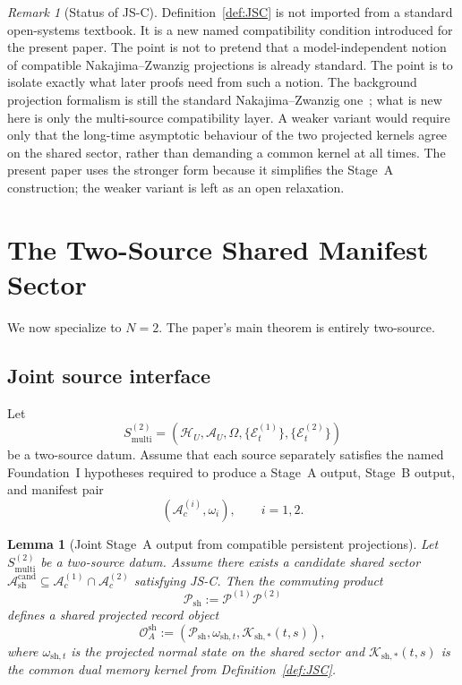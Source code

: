\documentclass[12pt]{article}
\newtheorem{lemma}[theorem]{Lemma}
\theoremstyle{definition}
\theoremstyle{remark}
\newtheorem{remark}[theorem]{Remark}
\begin{document}
\begin{remark}[Status of JS-C]
Definition~\ref{def:JSC} is not imported from a standard open-systems
textbook. It is a new named compatibility condition introduced for the
present paper. The point is not to pretend that a model-independent
notion of compatible Nakajima--Zwanzig projections is already standard.
The point is to isolate exactly what later proofs need from such a
notion. The background projection formalism is still the standard
Nakajima--Zwanzig one~\cite{Nakajima1958,Zwanzig1960}; what is new here
is only the multi-source compatibility layer. A weaker variant would
require only that the long-time asymptotic behaviour of the two
projected kernels agree on the shared sector, rather than demanding a
common kernel at all times. The present paper uses the stronger form
because it simplifies the Stage~A construction; the weaker variant is
left as an open relaxation.
\end{remark}

\section{The Two-Source Shared Manifest Sector}\label{sec:two}

We now specialize to \(N=2\). The paper's main theorem is entirely
two-source.

\subsection{Joint source interface}

Let
\[
S_{\mathrm{multi}}^{(2)}
=
(\mathcal H_U,\mathcal A_U,\Omega,\{\mathcal E_t^{(1)}\},\{\mathcal E_t^{(2)}\})
\]
be a two-source datum. Assume that each source separately satisfies the
named Foundation~I hypotheses required to produce a Stage~A output,
Stage~B output, and manifest pair
\[
(\mathcal A_c^{(i)},\omega_i),
\qquad
i=1,2.
\]

\begin{lemma}[Joint Stage~A output from compatible persistent projections]
\label{lem:jointA}
Let \(S_{\mathrm{multi}}^{(2)}\) be a two-source datum. Assume there
exists a candidate shared sector
\(\mathcal A_{\mathrm{sh}}^{\mathrm{cand}}\subseteq
\mathcal A_c^{(1)}\cap\mathcal A_c^{(2)}\) satisfying JS-C. Then the
commuting product
\[
\mathcal P_{\mathrm{sh}}
:=
\mathcal P^{(1)}\mathcal P^{(2)}
\]
defines a shared projected record object
\[
\mathcal O_A^{\mathrm{sh}}
:=
(\mathcal P_{\mathrm{sh}},\omega_{\mathrm{sh},t},\mathcal K_{\mathrm{sh},*}(t,s)),
\]
where \(\omega_{\mathrm{sh},t}\) is the projected normal state on the
shared sector and \(\mathcal K_{\mathrm{sh},*}(t,s)\) is the common dual
memory kernel from Definition~\ref{def:JSC}.
\end{lemma}
\end{document}
